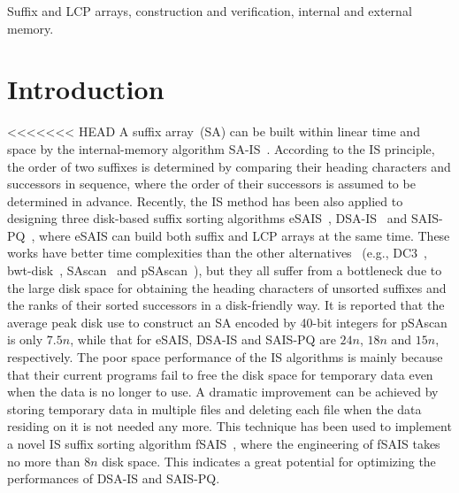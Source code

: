 \documentclass[10pt,journal,compsoc]{IEEEtran}
\begin{document}
{\begin{abstract}
\end{abstract}

\begin{IEEEkeywords}
Suffix and LCP arrays, construction and verification, internal and external memory.
\end{IEEEkeywords}}


\maketitle

\IEEEdisplaynontitleabstractindextext

\IEEEpeerreviewmaketitle

\section{Introduction}\label{sec:introduction}

<<<<<<< HEAD
A suffix array~(SA) can be built within linear time and space by the internal-memory algorithm SA-IS~\cite{Nong11}. According to the IS principle, the order of two suffixes is determined by comparing their heading characters and successors in sequence, where the order of their successors is assumed to be determined in advance. Recently, the IS method has been also applied to designing three disk-based suffix sorting algorithms eSAIS~\cite{Bingmann12}, DSA-IS~\cite{Nong15} and SAIS-PQ~\cite{Liu15}, where eSAIS can build both suffix and LCP arrays at the same time. These works have better time complexities than the other alternatives ~(e.g., DC3~\cite{Dementiev2008a}, bwt-disk~\cite{Ferragina2012}, SAscan~\cite{Karkkainen2014} and pSAscan~\cite{Karkkainen2015}), but they all suffer from a bottleneck due to the large disk space for obtaining the heading characters of unsorted suffixes and the ranks of their sorted successors in a disk-friendly way. It is reported that the average peak disk use to construct an SA encoded by 40-bit integers for pSAscan is only $7.5n$, while that for eSAIS, DSA-IS and SAIS-PQ are $24n$, $18n$ and $15n$, respectively. The poor space performance of the IS algorithms is mainly because that their current programs fail to free the disk space for temporary data even when the data is no longer to use. A dramatic improvement can be achieved by storing temporary data in multiple files and deleting each file when the data residing on it is not needed any more. This technique has been used to implement a novel IS suffix sorting algorithm fSAIS~\cite{Karkkainen2017}, where the engineering of fSAIS takes no more than $8n$ disk space. This indicates a great potential for optimizing the performances of DSA-IS and SAIS-PQ.
\end{document}
